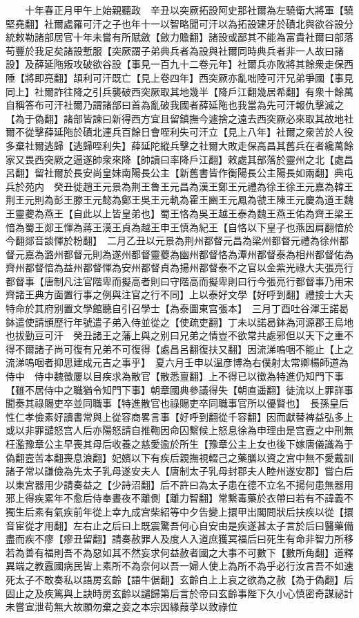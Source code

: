 　　十年春正月甲午上始親聽政　辛丑以突厥拓設阿史那社爾為左驍衛大將軍【驍堅堯翻】社爾處羅可汗之子也年十一以智略聞可汗以為拓設建牙於磧北與欲谷設分統敕勒諸部居官十年未嘗有所賦斂【斂力贍翻】諸設或鄙其不能為富貴社爾曰部落苟豐於我足矣諸設慙服【突厥謂子弟典兵者為設與社爾同時典兵者非一人故曰諸設】及薛延陁叛攻破欲谷設【事見一百九十二卷元年】社爾兵亦敗將其餘衆走保西陲【將即亮翻】頡利可汗既亡【見上卷四年】西突厥亦亂咄陸可汗兄弟爭國【事見同上】社爾詐往降之引兵襲破西突厥取其地幾半【降戶江翻幾居希翻】有衆十餘萬自稱答布可汗社爾乃謂諸部曰首為亂破我國者薛延陁也我當為先可汗報仇擊滅之【為于偽翻】諸部皆諫曰新得西方宜且留鎮撫今遽捨之遠去西突厥必來取其故地社爾不從擊薛延陁於磧北連兵百餘日會咥利失可汗立【見上八年】社爾之衆苦於人役多棄社爾逃歸【逃歸咥利失】薛延陀縱兵擊之社爾大敗走保高昌其舊兵在者纔萬餘家又畏西突厥之逼遂帥衆來降【帥讀曰率降戶江翻】敕處其部落於靈州之北【處昌呂翻】留社爾於長安尚皇妹南陽長公主【新舊書皆作衡陽長公主陽長如兩翻】典屯兵於苑内　癸丑徙趙王元景為荆王魯王元昌為漢王鄭王元禮為徐王徐王元嘉為韓王荆王元則為彭王滕王元懿為鄭王吳王元軌為霍王豳王元鳳為虢王陳王元慶為道王魏王靈虁為燕王【自此以上皆皇弟也】蜀王恪為吳王越王泰為魏王燕王佑為齊王梁王愔為蜀王郯王惲為蔣王漢王貞為越王申王慎為紀王【自恪以下皇子也燕因肩翻愔於今翻郯音談惲於粉翻】　二月乙丑以元景為荆州都督元昌為梁州都督元禮為徐州都督元嘉為潞州都督元則為遂州都督靈蘷為幽州都督恪為潭州都督泰為相州都督佑為齊州都督愔為益州都督惲為安州都督貞為揚州都督泰不之官以金紫光祿大夫張亮行都督事【唐制凡注官階卑而擬高者則曰守階高而擬卑則曰行今張亮行都督事乃用宋齊諸王典方面置行事之例與注官之行不同】上以泰好文學【好呼到翻】禮接士大夫特命於其府别置文學館聽自引召學士【為泰圖東宫張本】　三月丁酉吐谷渾王諾曷鉢遣使請頒歷行年號遣子弟入侍並從之【使疏吏翻】丁未以諾曷鉢為河源郡王烏地也拔勤豆可汗　癸丑諸王之藩上與之别曰兄弟之情豈不欲常共處邪但以天下之重不得不爾諸子尚可復有兄弟不可復得【處昌呂翻復扶又翻】因流涕嗚咽不能止【上之流涕嗚咽者抑思建成元吉之事乎】　夏六月壬申以温彦博為右僕射太常卿楊師道為侍中　侍中魏徵屢以目疾求為散官【散悉亶翻】上不得已以徵為特進仍知門下事【雖不居侍中之職猶令知門下事】朝章國典參議得失【朝直遥翻】徒流以上罪詳事聞奏其祿賜吏卒並同職事【特進散官也祿賜吏卒同職事官所以優賢也】　長孫皇后性仁孝儉素好讀書常與上從容商畧言事【好呼到翻從千容翻】因而獻替裨益弘多上或以非罪譴怒宫人后亦陽怒請自推鞫因命囚繫候上怒息徐為申理由是宫壼之中刑無枉濫豫章公主早喪其母后收養之慈愛逾於所生【豫章公主上女也後下嫁唐儀識為于偽翻壼苦本翻喪息浪翻】妃嬪以下有疾后親撫視輟己之藥膳以資之宫中無不愛戴訓諸子常以謙儉為先太子乳母遂安夫人【唐制太子乳母封郡夫人睦州遂安郡】嘗白后以東宫器用少請奏益之【少詩沼翻】后不許曰為太子患在德不立名不揚何患無器用邪上得疾累年不愈后侍奉晝夜不離側【離力智翻】常繫毒藥於衣帶曰若有不諱義不獨生后素有氣疾前年從上幸九成宫柴紹等中夕告變上擐甲出閣問狀后扶疾以從【擐音宦從才用翻】左右止之后曰上既震驚吾何心自安由是疾遂甚太子言於后曰醫藥備盡而疾不瘳【瘳丑留翻】請奏赦罪人及度人入道庶獲冥福后曰死生有命非智力所移若為善有福則吾不為惡如其不然妄求何益赦者國之大事不可數下【數所角翻】道釋異端之教蠧國病民皆上素所不為奈何以吾一婦人使上為所不為乎必行汝言吾不如速死太子不敢奏私以語房玄齡【語牛倨翻】玄齡白上上哀之欲為之赦【為于偽翻】后固止之及疾篤與上訣時房玄齡以譴歸第后言於帝曰玄齡事陛下久小心慎密奇謀祕計未嘗宣泄苟無大故願勿棄之妾之本宗因緣葭莩以致祿位